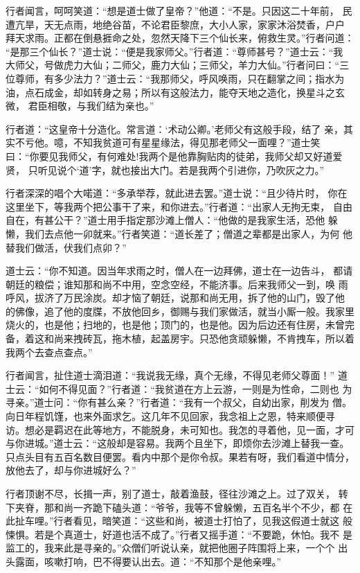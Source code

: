 行者闻言，呵呵笑道：“想是道士做了皇帝？”他道：“不是。只因这二十年前，
民遭亢旱，天无点雨，地绝谷苗，不论君臣黎庶，大小人家，家家沐浴焚香，户户
拜天求雨。正都在倒悬捱命之处，忽然天降下三个仙长来，俯救生灵。”行者问道：
“是那三个仙长？”道士说：“便是我家师父。”行者道：“尊师甚号？”道士云：“我
大师父，号做虎力大仙；二师父，鹿力大仙；三师父，羊力大仙。”行者问曰：“三
位尊师，有多少法力？”道士云：“我那师父，呼风唤雨，只在翻掌之间；指水为
油，点石成金，却如转身之易；所以有这般法力，能夺天地之造化，换星斗之玄微，
君臣相敬，与我们结为亲也。”

行者道：“这皇帝十分造化。常言道：‘术动公卿。’老师父有这般手段，结了
亲，其实不亏他。噫，不知我贫道可有星星缘法，得见那老师父一面哩？”道士笑
曰：“你要见我师父，有何难处!我两个是他靠胸贴肉的徒弟，我师父却又好道爱贤，
只听见说个‘道’字，就也接出大门。若是我两个引进你，乃吹灰之力。”

行者深深的唱个大喏道：“多承举荐，就此进去罢。”道士说：“且少待片时，
你在这里坐下，等我两个把公事干了来，和你进去。”行者道：“出家人无拘无束，
自由自在，有甚公干？”道士用手指定那沙滩上僧人：“他做的是我家生活，恐他
躲懒，我们去点他一卯就来。”行者笑道：“道长差了；僧道之辈都是出家人，为何
他替我们做活，伏我们点卯？”

道士云：“你不知道。因当年求雨之时，僧人在一边拜佛，道士在一边告斗，
都请朝廷的粮偿；谁知那和尚不中用，空念空经，不能济事。后来我师父一到，唤
雨呼风，拔济了万民涂炭。却才恼了朝廷，说那和尚无用，拆了他的山门，毁了他
的佛像，追了他的度牒，不放他回乡，御赐与我们家做活，就当小厮一般。我家里
烧火的，也是他；扫地的，也是他；顶门的，也是他。因为后边还有住房，未曾完
备，着这和尚来拽砖瓦，拖木植，起盖房宇。只恐他贪顽躲懒，不肯拽车，所以着
我两个去查点查点。”

行者闻言，扯住道士滴泪道：“我说我无缘，真个无缘，不得见老师父尊面！”
道士云：“如何不得见面？”行者道：“我贫道在方上云游，一则是为性命，二则也
为寻亲。”道士问：“你有甚么亲？”行者道：“我有一个叔父，自幼出家，削发为
僧。向日年程饥馑，也来外面求乞。这几年不见回家，我念祖上之恩，特来顺便寻
访。想必是羁迟在此等地方，不能脱身，未可知也。我怎的寻着他，见一面，才可
与你进城。”道士云：“这般却是容易。我两个且坐下，即烦你去沙滩上替我一查。
只点头目有五百名数目便罢。看内中那个是你令叔。果若有呀，我们看道中情分，
放他去了，却与你进城好么？”

行者顶谢不尽，长揖一声，别了道士，敲着渔鼓，径往沙滩之上。过了双关，
转下夹脊，那和尚一齐跪下磕头道：“爷爷，我等不曾躲懒，五百名半个不少，都
在此扯车哩。”行者看见，暗笑道：“这些和尚，被道士打怕了，见我这假道士就这
般悚惧。若是个真道士，好道也活不成了。”行者又摇手道：“不要跪，休怕。我不
是监工的，我来此是寻亲的。”众僧们听说认亲，就把他圈子阵围将上来，一个个
出头露面，咳嗽打响，巴不得要认出去。道：“不知那个是他亲哩。”

